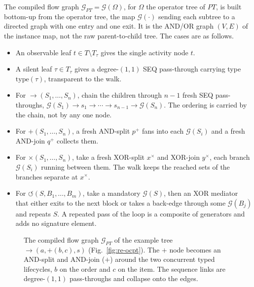 \begin{definition}
  \label{def:pt-flow-graph}
  The compiled flow graph $\mathcal{G}_{PT}=\mathcal{G}(\Omega)$, for $\Omega$ the operator tree of $PT$, is built bottom-up from the
  operator tree, the map $\mathcal{G}(\cdot)$ sending each subtree to a directed graph with one
  entry and one exit. It is the AND/OR graph $(V,E)$ of the instance map, not the raw
  parent-to-child tree. The cases are as follows.
  \begin{itemize}
    \item An observable leaf $t\in T\setminus T_\tau$ gives the single activity node $t$.
    \item A silent leaf $\tau\in T_\tau$ gives a degree-$(1,1)$ SEQ pass-through carrying type
      $\mathrm{type}(\tau)$, transparent to the walk.
    \item For $\to(S_1,\ldots,S_n)$, chain the children through $n{-}1$ fresh SEQ pass-throughs,
      $\mathcal{G}(S_1)\to s_1\to\cdots\to s_{n-1}\to\mathcal{G}(S_n)$. The ordering is carried by the
      chain, not by any one node.
    \item For $+(S_1,\ldots,S_n)$, a fresh AND-split $p^+$ fans into each $\mathcal{G}(S_i)$ and a
      fresh AND-join $q^+$ collects them.
    \item For $\times(S_1,\ldots,S_n)$, take a fresh XOR-split $x^\times$ and XOR-join $y^\times$, each
      branch $\mathcal{G}(S_i)$ running between them. The walk keeps the reached sets of the branches separate at $x^\times$.
    \item For $\circlearrowleft(S,B_1,\ldots,B_m)$, take a mandatory $\mathcal{G}(S)$, then an XOR mediator
      that either exits to the next block or takes a back-edge through some $\mathcal{G}(B_j)$ and
      repeats $S$. A repeated pass of the loop is a composite of generators and adds no signature
      element.
  \end{itemize}
\end{definition}

\begin{figure}[tp]
  \centering
  \unskip
  \caption{The compiled flow graph $\mathcal{G}_{PT}$ of the example tree $\to(a,+(b,c),s)$
    (Fig.~\ref{fig:re-ocpt}). The $+$ node becomes an AND-split and AND-join ($+$) around the
    two concurrent typed lifecycles, $b$ on the order and $c$ on the item. The sequence links are
    degree-$(1,1)$ pass-throughs and collapse onto the edges.}
  \label{fig:re-pt-flow}
\end{figure}

